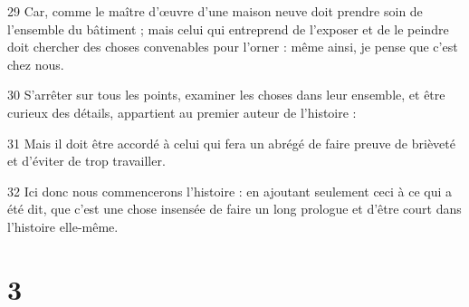 \par 29 Car, comme le maître d'œuvre d'une maison neuve doit prendre soin de l'ensemble du bâtiment ; mais celui qui entreprend de l'exposer et de le peindre doit chercher des choses convenables pour l'orner : même ainsi, je pense que c'est chez nous.
\par 30 S'arrêter sur tous les points, examiner les choses dans leur ensemble, et être curieux des détails, appartient au premier auteur de l'histoire :
\par 31 Mais il doit être accordé à celui qui fera un abrégé de faire preuve de brièveté et d'éviter de trop travailler.
\par 32 Ici donc nous commencerons l'histoire : en ajoutant seulement ceci à ce qui a été dit, que c'est une chose insensée de faire un long prologue et d'être court dans l'histoire elle-même.

\chapter{3}

